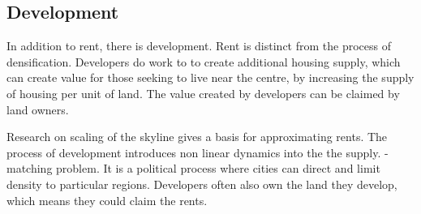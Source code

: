 %


\subsection{Development}
\label{Sec:Development}

In addition to rent, there is development. Rent is distinct from the process of densification. Developers do work to to create additional housing supply, which can create value for those seeking to live near the centre, by increasing the supply of housing per unit of land. The value created by developers can be claimed by land owners.

 Research on scaling of the skyline gives a basis for approximating rents. 
The process of development introduces non linear dynamics into the the supply. - matching problem.
It is a political process where cities can direct and limit density to particular regions. 
Developers often also own the land they develop, which means they could claim the rents.


